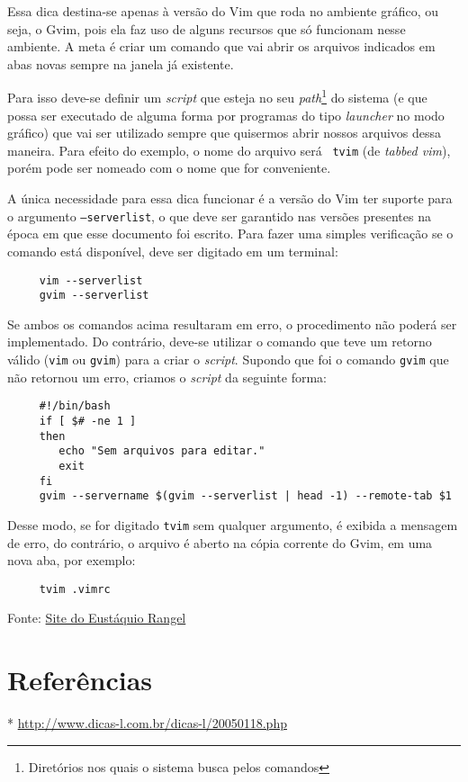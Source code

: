 Essa dica destina-se apenas à versão do Vim que roda no ambiente gráfico, ou
seja, o Gvim, pois ela faz uso de alguns recursos que só funcionam nesse
ambiente. A meta é criar um comando que vai abrir os arquivos indicados em abas
novas sempre na janela já existente. 

Para isso deve-se definir um {\em script} que esteja no seu
{\em path}\footnote{Diretórios nos quais o sistema busca pelos comandos} do sistema
(e que possa ser executado de alguma forma por programas do tipo {\em launcher}
no modo gráfico) que vai ser utilizado sempre que quisermos abrir nossos
arquivos dessa maneira. Para efeito do exemplo, o nome do arquivo será {\tt
tvim} (de {\em tabbed vim}), porém pode ser nomeado com o nome que for
conveniente.

A única necessidade para essa dica funcionar é a versão do Vim ter suporte para
o argumento {\tt --serverlist}, o que deve ser garantido nas versões presentes
na época em que esse documento foi escrito. Para fazer uma simples verificação
se o comando está disponível, deve ser digitado em um terminal:

\begin{verbatim}
     vim --serverlist
     gvim --serverlist
\end{verbatim}

Se ambos os comandos acima resultaram em erro, o procedimento não poderá ser
implementado. Do contrário, deve-se utilizar o comando que teve um retorno
válido ({\tt vim} ou {\tt gvim}) para a criar o {\em script}. Supondo que foi o
comando {\tt gvim} que não retornou um erro, criamos o {\em script} da seguinte
forma:

\begin{verbatim}
     #!/bin/bash
     if [ $# -ne 1 ]
     then
        echo "Sem arquivos para editar."
        exit
     fi
     gvim --servername $(gvim --serverlist | head -1) --remote-tab $1
\end{verbatim}

Desse modo, se for digitado {\tt tvim} sem qualquer argumento, é exibida a
mensagem de erro, do contrário, o arquivo é aberto na cópia corrente do Gvim,
em uma nova aba, por exemplo:

\begin{verbatim}
     tvim .vimrc
\end{verbatim}

Fonte: \href{http://eustaquiorangel.com/posts/477}{Site do Eustáquio
Rangel}~\cite{SiteEustaquioRangel02}

\section{Referências}
* \url{http://www.dicas-l.com.br/dicas-l/20050118.php}
